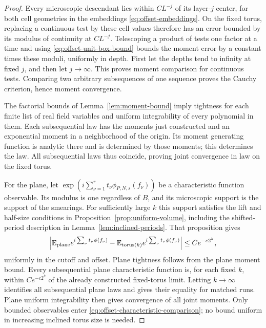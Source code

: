 \begin{proof}
Every microscopic descendant lies within $CL^{-j}$ of its layer-$j$
center, for both cell geometries in the embeddings
\eqref{eq:offset-embeddings}.  On the fixed torus, replacing a continuous
test by these cell values therefore has an error bounded by its modulus
of continuity at $CL^{-j}$.  Telescoping a product of tests one factor
at a time and using \eqref{eq:offset-unit-box-bound} bounds the moment
error by a constant times these moduli, uniformly in depth.  First let
the depths tend to infinity at fixed $j$, and then let $j\to\infty$.
This proves moment comparison for continuous tests.  Comparing two
arbitrary subsequences of one sequence proves the Cauchy criterion,
hence moment convergence.

The factorial bounds of Lemma~\ref{lem:moment-bound} imply tightness for
each finite list of real field variables and uniform integrability of
every polynomial in them.  Each subsequential law has the moments just
constructed and an exponential moment in a neighborhood of the origin.
Its moment generating function is analytic there and is determined by
those moments; this determines the law.  All subsequential laws thus
coincide, proving joint convergence in law on the fixed torus.

For the plane, let
$\exp(i\sum_{\nu=1}^r t_\nu\phi_{P,N,s}(f_\nu))$ be a characteristic
function observable.  Its modulus is one regardless of $B$, and its
microscopic support is the support of the smearings.  For sufficiently
large $k$ this support satisfies the lift and half-size conditions in
Proposition~\ref{prop:uniform-volume}, including the shifted-period
description in Lemma~\ref{lem:inclined-periods}.  That proposition gives
\begin{equation}
 \left|\mathbb E_{\mathrm{plane}}e^{i\sum_\nu t_\nu\phi(f_\nu)}
 -\mathbb E_{\mathrm{torus}(k)}e^{i\sum_\nu t_\nu\phi(f_\nu)}\right|
 \le Ce^{-c2^k},
 \label{eq:offset-characteristic-comparison}
\end{equation}
uniformly in the cutoff and offset.  Plane tightness follows from the
plane moment bound.  Every subsequential plane characteristic function
is, for each fixed $k$, within $Ce^{-c2^k}$ of the already constructed
fixed-torus limit.  Letting $k\to\infty$ identifies all subsequential
plane laws and gives their equality for matched runs.  Plane uniform
integrability then gives convergence of all joint moments.  Only bounded
observables enter \eqref{eq:offset-characteristic-comparison}; no bound
uniform in increasing inclined torus size is needed.


\end{proof}
